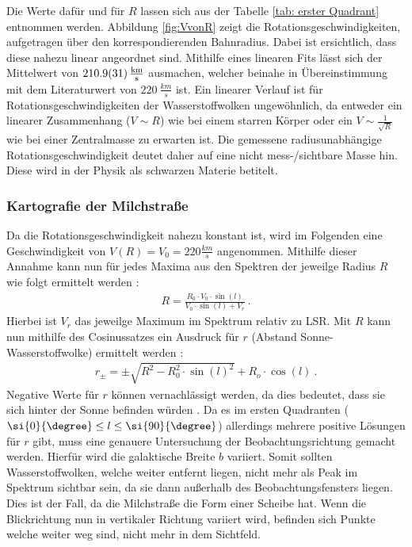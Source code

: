 Die Werte dafür und für $R$ lassen sich aus der Tabelle \ref{tab: erster Quadrant} entnommen werden. Abbildung \ref{fig:VvonR} zeigt die Rotationsgeschwindigkeiten, aufgetragen über den korrespondierenden Bahnradius. Dabei ist ersichtlich, dass diese nahezu linear angeordnet sind. Mithilfe eines linearen Fits lässt sich der Mittelwert von $\SI{210.9 \pm 3.1}{\frac{km}{s}}$ ausmachen, welcher beinahe in Übereinstimmung mit dem Literaturwert von $\SI{220}{\frac{km}{s}}$ \cite{LSR} ist. Ein linearer Verlauf ist für Rotationsgeschwindigkeiten der Wasserstoffwolken ungewöhnlich, da entweder ein linearer Zusammenhang ($V \sim R$) wie bei einem starren Körper oder ein $V \sim\frac{1}{\sqrt{R}}$ wie bei einer Zentralmasse zu erwarten ist. Die gemessene radiusunabhängige Rotationsgeschwindigkeit deutet daher auf eine nicht mess-/sichtbare Masse hin. Diese wird in der Physik als schwarzen Materie betitelt.

\subsubsection{Kartografie der Milchstraße}
Da die Rotationsgeschwindigkeit nahezu konstant ist, wird im Folgenden eine Geschwindigkeit von $V(R) = V_0 = \si{220}{\frac{km}{s}}$ angenommen. Mithilfe dieser Annahme kann nun für jedes Maxima aus den Spektren der jeweilge Radius $R$ wie folgt ermittelt werden \cite{H1}:
\begin{align}
    R =\frac{R_0 \cdot V_0 \cdot \sin(l)}{V_0 \cdot \sin(l) + V_r} \ .
    \label{eq:BerechnungR}
\end{align}
Hierbei ist $V_r$ das jeweilge Maximum im Spektrum relativ zu LSR.\newline
Mit $R$ kann nun mithilfe des Cosinussatzes ein Ausdruck für $r$ (Abstand Sonne-Wasserstoffwolke) ermittelt werden \cite{H1}:
\begin{align}
    r_{\pm} = \pm \sqrt{R^2 - R_0^2 \cdot \sin(l)^2} + R_o \cdot \cos(l) \ .
    \label{eq:Berechnungr}
\end{align}
Negative Werte für $r$ können vernachlässigt werden, da dies bedeutet, dass sie sich hinter der Sonne befinden würden \cite{H1}. Da es im ersten Quadranten ($ \si{0}{\degree} \le l \le \si{90}{\degree}$) allerdings mehrere positive Lösungen für $r$ gibt, muss eine genauere Untersuchung der Beobachtungsrichtung gemacht werden. 
Hierfür wird die galaktische Breite $b$ variiert. Somit sollten Wasserstoffwolken, welche weiter entfernt liegen, nicht mehr als Peak im Spektrum sichtbar sein, da sie dann außerhalb des Beobachtungsfensters liegen. Dies ist der Fall, da die Milchstraße die Form einer Scheibe hat. Wenn die Blickrichtung nun in vertikaler Richtung variiert wird, befinden sich Punkte welche weiter weg sind, nicht mehr in dem Sichtfeld.

